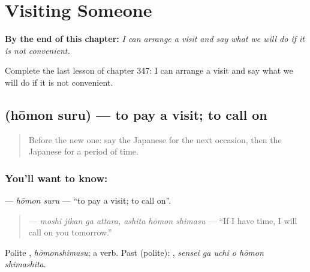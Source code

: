 
\chapter{Visiting Someone}
\label{ch:ja-visiting-someone}

\begin{chapteropening}
\textbf{By the end of this chapter:} \emph{I can arrange a visit and say what we will do if it is not convenient.}

Complete the last lesson of chapter 347: I can arrange a visit and say what we will do if it is not convenient.
\end{chapteropening}

\section[\texorpdfstring{\ja{ほうもんする} (hōmon suru)}{ほうもんする (hōmon suru)}]{ (hōmon suru) — to pay a visit; to call on}

\label{lesson:JA-C347-houmon-suru}



\begin{quote}
Before the new one: say the Japanese for the next occasion, then the Japanese for a period of time.
\end{quote}

\subsection*{You'll want to know: }
\textbf{} — \emph{hōmon suru} — \textquotedblleft{}to pay a visit; to call on\textquotedblright{}.

\begin{quote}
\textbf{   } — \emph{moshi jikan ga attara, ashita hōmon shimasu} — \textquotedblleft{}If I have time, I will call on you tomorrow.\textquotedblright{}
\end{quote}

Polite \textbf{}, \emph{hōmonshimasu}; a  verb. Past (polite): \textbf{  }, \emph{sensei ga uchi o hōmon shimashita}.


